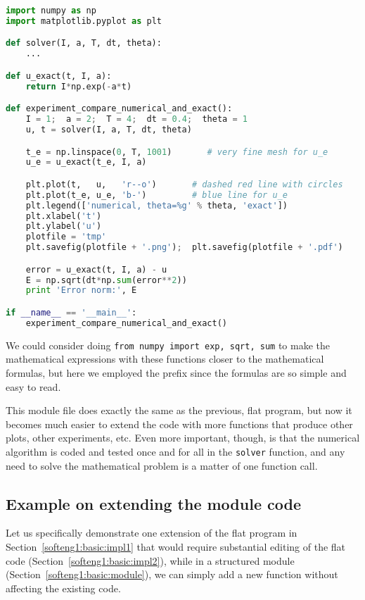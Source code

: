 \documentclass[graybox,sectrefs,envcountresetchap,open=right,final]{svmonodo}
\begin{document}
\begin{lstlisting}[language=python,style=blue1_bluegreen]
import numpy as np
import matplotlib.pyplot as plt

def solver(I, a, T, dt, theta):
    ...

def u_exact(t, I, a):
    return I*np.exp(-a*t)

def experiment_compare_numerical_and_exact():
    I = 1;  a = 2;  T = 4;  dt = 0.4;  theta = 1
    u, t = solver(I, a, T, dt, theta)

    t_e = np.linspace(0, T, 1001)       # very fine mesh for u_e
    u_e = u_exact(t_e, I, a)

    plt.plot(t,   u,   'r--o')       # dashed red line with circles
    plt.plot(t_e, u_e, 'b-')         # blue line for u_e
    plt.legend(['numerical, theta=%g' % theta, 'exact'])
    plt.xlabel('t')
    plt.ylabel('u')
    plotfile = 'tmp'
    plt.savefig(plotfile + '.png');  plt.savefig(plotfile + '.pdf')

    error = u_exact(t, I, a) - u
    E = np.sqrt(dt*np.sum(error**2))
    print 'Error norm:', E

if __name__ == '__main__':
    experiment_compare_numerical_and_exact()

\end{lstlisting}

We could consider doing \texttt{from numpy import exp, sqrt, sum} to make
the mathematical expressions with these functions closer to the
mathematical formulas, but here we employed the prefix since the
formulas are so simple and easy to read.

This module file does exactly the same as the previous, flat program,
but now it becomes much easier to extend the code with more functions
that produce other plots, other experiments, etc. Even more important, though,
is that the numerical
algorithm is coded and tested once and for all in the \texttt{solver}
function, and any need to solve the mathematical problem is a matter
of one function call.

\subsection{Example on extending the module code}
\label{softeng1:basic:experiment2}

Let us specifically demonstrate one extension of the flat program in
Section~\ref{softeng1:basic:impl1} that would require substantial
editing of the flat code (Section~\ref{softeng1:basic:impl2}), while in
a structured module (Section~\ref{softeng1:basic:module}), we can
simply add a new function without affecting the existing code.
\end{document}
